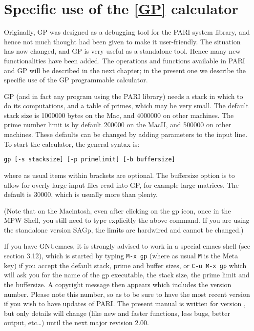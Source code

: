 \chapter{Specific use of the {\bf \ref{GP}} calculator}

Originally, GP was designed as a debugging tool for the PARI system library,
and hence not much thought had been given to make it user-friendly. The
situation has now changed, and GP is very useful as a standalone
tool. Hence many new functionalities have been added.
The operations and functions available in PARI
and GP will be described  in the next chapter; in the present one we describe
the specific use of the GP programmable calculator.

GP (and in fact any program using the PARI library) needs a stack in which
to do its computations, and a table of primes, which may be very small.
The default stack size is 1000000 bytes on the Mac, and 4000000 on
other machines. The prime number limit is by default
200000 on the MacII, and 500000 on other machines. These defaults can be
changed by adding parameters to the input line. To start the
calculator, the general syntax is:

\centerline{\tt gp [-s stacksize] [-p primelimit] [-b buffersize]}

where as usual items within brackets are optional. The buffersize option is
to allow for overly large input files read into GP, for example large
matrices. The default is 30000, which is usually more than plenty.

(Note that on the Macintosh, even after clicking on the gp icon,
once in the MPW Shell, you still need to type explicitly the above command.
If you are using the standalone version SAGp, the limits are hardwired and
cannot be changed.)

If you have GNUemacs, it is strongly advised to work in a special emacs
shell (see section 3.12), which is started by typing {\tt M-x gp}
(where as usual {\tt M} is the Meta key) if you accept the default
stack, prime and buffer sizes, or {\tt C-u M-x gp} which will ask you for
the name of the gp executable, the stack size, the prime limit and the
buffersize. 
\smallskip
A copyright message then appears which includes the version
number. Please note this number, so as to be sure to have the most recent
version if you wish to have updates of PARI. The present manual is written
for version \vers, but only details will change (like new and faster functions,
less bugs, better output, etc\dots ) until the next major revision 2.00.

